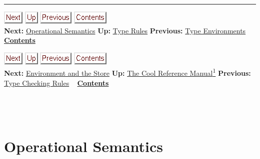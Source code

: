 \documentclass[]{article}
\begin{document}
\begin{center}\rule{3in}{0.4pt}\end{center}

\href{node44.html}{\includegraphics{next.png}}
\href{node41.html}{\includegraphics{up.png}}
\href{node42.html}{\includegraphics{prev.png}}
\href{node1.html}{\includegraphics{contents.png}} \\ \textbf{Next:}
\href{node44.html}{Operational Semantics} \textbf{Up:}
\href{node41.html}{Type Rules} \textbf{Previous:}
\href{node42.html}{Type Environments} ~
\textbf{\href{node1.html}{Contents}}

\href{node45.html}{\includegraphics{next.png}}
\href{cool-manual.html}{\includegraphics{up.png}}
\href{node43.html}{\includegraphics{prev.png}}
\href{node1.html}{\includegraphics{contents.png}} \\ \textbf{Next:}
\href{node45.html}{Environment and the Store} \textbf{Up:}
\href{cool-manual.html}{The Cool Reference Manual\textsuperscript{1}}
\textbf{Previous:} \href{node43.html}{Type Checking Rules} ~
\textbf{\href{node1.html}{Contents}} \\ \\

\section{\\ Operational Semantics}
\end{document}
